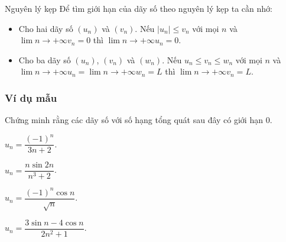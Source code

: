 
\begin{dang}{Nguyên lý kẹp}
		Để tìm giới hạn của dãy số theo nguyên lý kẹp ta cần nhớ:
	\begin{itemize}
		\item Cho hai dãy số $(u_n)$ và $(v_n)$. Nếu $|u_n| \leq v_n$ với mọi $n$ và $\lim \limits{n \to +\infty}v_n = 0$ thì $\lim \limits{n \to +\infty}u_n =0$.
		\item Cho ba dãy số $(u_n)$, $(v_n)$ và $(w_n)$. Nếu $ u_n \leq v_n \leq w_n$ với mọi $n$ và $\lim \limits{n \to +\infty}u_n = \lim \limits{n \to +\infty}w_n = L$ thì $\lim \limits{n \to +\infty}v_n = L$.
	\end{itemize}
\end{dang}
\subsubsection{Ví dụ mẫu}
\begin{vd}%
	Chứng minh rằng các dãy số với số hạng tổng quát sau đây có giới hạn $0$.
	\begin{enumEX}[a)]{2}
		\item $u_n=\dfrac{(-1)^n}{3n+2}$.
		\item $u_n=\dfrac{n\sin 2n}{n^3+2}$.
		\item $u_n=\dfrac{(-1)^n\cos n}{\sqrt{n}}$.
		\item $u_n=\dfrac{3\sin n-4\cos n}{2n^2+1}$.
	\end{enumEX}
\end{vd}
